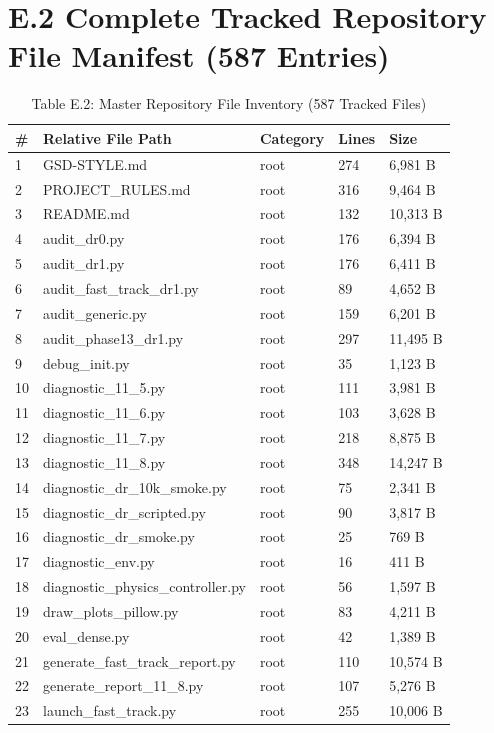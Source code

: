 \documentclass[11pt,a4paper,oneside]{book}
\begin{document}
\section{E.2 Complete Tracked Repository File Manifest (587 Entries)}
\begin{longtable}{l l l l l}\caption{Table E.2: Master Repository File Inventory (587 Tracked Files)}\\\toprule
\# & Relative File Path & Category & Lines & Size \\ \midrule \endhead
1 & GSD-STYLE.md & root & 274 & 6,981 B \\
2 & PROJECT\_RULES.md & root & 316 & 9,464 B \\
3 & README.md & root & 132 & 10,313 B \\
4 & audit\_dr0.py & root & 176 & 6,394 B \\
5 & audit\_dr1.py & root & 176 & 6,411 B \\
6 & audit\_fast\_track\_dr1.py & root & 89 & 4,652 B \\
7 & audit\_generic.py & root & 159 & 6,201 B \\
8 & audit\_phase13\_dr1.py & root & 297 & 11,495 B \\
9 & debug\_init.py & root & 35 & 1,123 B \\
10 & diagnostic\_11\_5.py & root & 111 & 3,981 B \\
11 & diagnostic\_11\_6.py & root & 103 & 3,628 B \\
12 & diagnostic\_11\_7.py & root & 218 & 8,875 B \\
13 & diagnostic\_11\_8.py & root & 348 & 14,247 B \\
14 & diagnostic\_dr\_10k\_smoke.py & root & 75 & 2,341 B \\
15 & diagnostic\_dr\_scripted.py & root & 90 & 3,817 B \\
16 & diagnostic\_dr\_smoke.py & root & 25 & 769 B \\
17 & diagnostic\_env.py & root & 16 & 411 B \\
18 & diagnostic\_physics\_controller.py & root & 56 & 1,597 B \\
19 & draw\_plots\_pillow.py & root & 83 & 4,211 B \\
20 & eval\_dense.py & root & 42 & 1,389 B \\
21 & generate\_fast\_track\_report.py & root & 110 & 10,574 B \\
22 & generate\_report\_11\_8.py & root & 107 & 5,276 B \\
23 & launch\_fast\_track.py & root & 255 & 10,006 B \\

\end{longtable}
\end{document}
